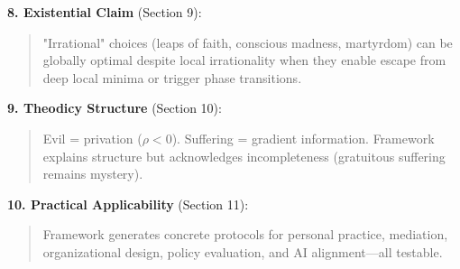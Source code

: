 \documentclass[11pt,a4paper]{article}
\theoremstyle{definition}
\theoremstyle{remark}
\newcommand{\CC}{\mathcal{C}}
\newcommand{\EE}{\mathbf{E}}
\newcommand{\WW}{\mathbf{W}}
\begin{document}
\begin{small}
\begin{enumerate}
\begin{mdframed}[backgroundcolor=blue!5,linewidth=2pt]
\textbf{8. Existential Claim} (Section 9):
\begin{quote}
"Irrational" choices (leaps of faith, conscious madness, martyrdom) can be globally optimal despite local irrationality when they enable escape from deep local minima or trigger phase transitions.
\end{quote}

\textbf{9. Theodicy Structure} (Section 10):
\begin{quote}
Evil = privation (\(\rho < 0\)). Suffering = gradient information. Framework explains structure but acknowledges incompleteness (gratuitous suffering remains mystery).
\end{quote}

\textbf{10. Practical Applicability} (Section 11):
\begin{quote}
Framework generates concrete protocols for personal practice, mediation, organizational design, policy evaluation, and AI alignment—all testable.
\end{quote}
\end{mdframed}

\begin{figure}[H]
\centering
{}
\end{figure}
\end{enumerate}
\end{small}
\end{document}

